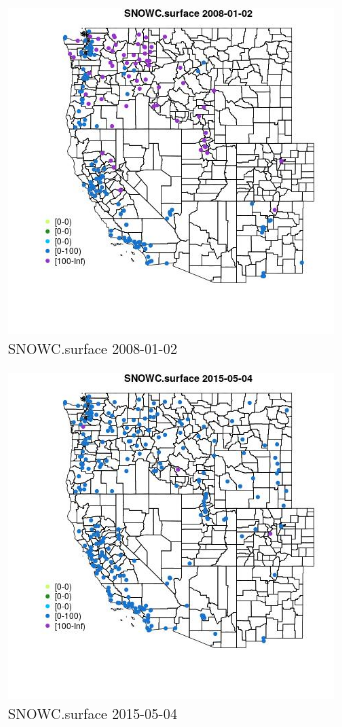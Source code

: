\begin{figure} 
\centering  
\includegraphics[width=0.77\textwidth]{Code_Outputs/Report_ML_input_PM25_Step4_part_e_de_duplicated_aves_compiled_2019-05-18wNAs_MapObsSNOWCsurface2008-01-02.jpg} 
\caption{\label{fig:Report_ML_input_PM25_Step4_part_e_de_duplicated_aves_compiled_2019-05-18wNAsMapObsSNOWCsurface2008-01-02}SNOWC.surface 2008-01-02} 
\end{figure} 
 

\begin{figure} 
\centering  
\includegraphics[width=0.77\textwidth]{Code_Outputs/Report_ML_input_PM25_Step4_part_e_de_duplicated_aves_compiled_2019-05-18wNAs_MapObsSNOWCsurface2015-05-04.jpg} 
\caption{\label{fig:Report_ML_input_PM25_Step4_part_e_de_duplicated_aves_compiled_2019-05-18wNAsMapObsSNOWCsurface2015-05-04}SNOWC.surface 2015-05-04} 
\end{figure} 
 

